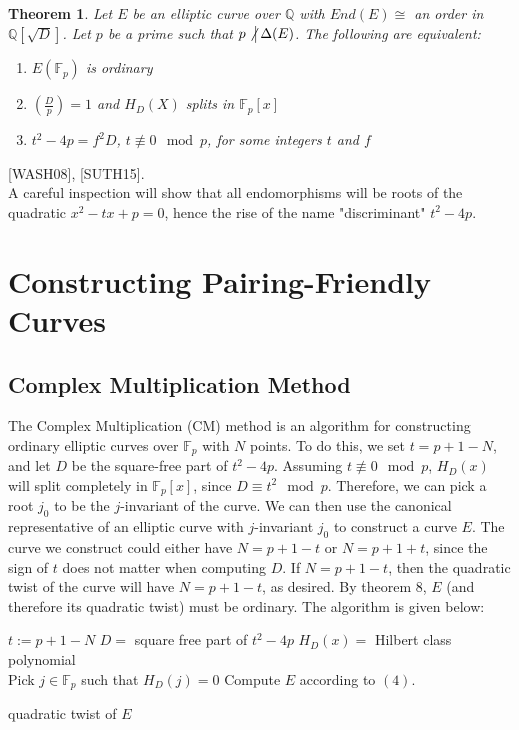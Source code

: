 \documentclass[12pt,twoside]{article}
\newcommand{\legendre}[2]{\genfrac{(}{)}{}{}{#1}{#2}}
\newtheorem{theorem}{Theorem}
\begin{document}
\begin{theorem}
Let $E$ be an elliptic curve over $\mathbb Q$ with $End(E) \cong $ an order in $\mathbb Q[\sqrt D]$. Let $p$ be a prime such that $p \not \big | \, \Delta(E)$. The following are equivalent:
\begin{enumerate} 
\item $E(\mathbb F_p)$ is ordinary
\item $\legendre{D}{p} = 1$ and $H_D(X)$ splits in $\mathbb F_p[x]$
\item $t^2 - 4p = f^2 D$, $t \not \equiv 0 \mod p$, for some integers $t$ and $f$
\end{enumerate}
\end{theorem}
[WASH08], [SUTH15].\\
A careful inspection will show that all endomorphisms will be roots of the quadratic $x^{2} - tx + p = 0$, hence the rise of the name "discriminant" $t^{2} - 4p$. 

\section{Constructing Pairing-Friendly Curves} 

\subsection{Complex Multiplication Method} 

The Complex Multiplication (CM) method is an algorithm for constructing ordinary elliptic curves over $\mathbb F_p$ with $N$ points. To do this, we set $t = p+1 - N$, and let $D$ be the square-free part of $t^2-4p$. Assuming $t \not \equiv 0 \mod p$, $H_{D}(x)$ will split completely in $\mathbb F_p[x]$, since $D \equiv t^2 \mod p$. Therefore, we can pick a root $j_0$ to be the $j$-invariant of the curve. We can then use the canonical representative of an elliptic curve with $j$-invariant $j_0$ to construct a curve $E$. The curve we construct could either have $N = p+1 - t$ or $N= p+1 + t$, since the sign of $t$ does not matter when computing $D$. If $N = p+1 -t$, then the quadratic twist of the curve will have $N = p+1 -t$, as desired. By theorem 8, $E$ (and therefore its quadratic twist) must be ordinary. The algorithm is given below:

\begin{algorithm}[H]
 $t := p+1 - N$\; 
 $D = $ square free part of $t^2-4p$\;
 $H_D(x) = $ Hilbert class polynomial \\
 Pick $j \in \mathbb F_p$ such that $H_D(j) = 0$
 Compute $E$ according to $(4)$.
 
  {
 }
 {\Return quadratic twist of $E$}
 \end{algorithm}
 \bigskip
 
\end{document}

